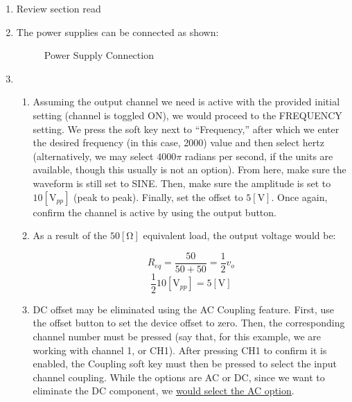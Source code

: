 \begin{enumerate}

  \item Review section read \textcolor{green}{\checkmark}

  \item The power supplies can be connected as shown:

    \begin{figure}[H]
      \centering
      
      \caption{Power Supply Connection}
      \label{fig:1}
    \end{figure}

  \item

    \begin{enumerate}

      \item Assuming the output channel we need is active with the provided initial setting (channel is toggled ON), we would proceed to the FREQUENCY setting. We press the soft key next to ``Frequency,'' after which we enter the desired frequency (in this case, 2000) value and then select hertz (alternatively, we may select $4000\pi$ radians per second, if the units are available, though this usually is not an option). From here, make sure the waveform is still set to SINE. Then, make sure the amplitude is set to $10[\si{\volt}_{pp}]$ (peak to peak). Finally, set the offset to $5[\si{\volt}]$. Once again, confirm the channel is active by using the output button.

      \item As a result of the $50[\si{\ohm}]$ equivalent load, the output voltage would be:

        $$R_{eq}=\frac{50}{50+50}=\frac{1}{2}v_{o}$$
        $$\frac{1}{2}10[\si{\volt}_{pp}]=5[\si{\volt}]$$

      \item DC offset may be eliminated using the AC Coupling feature. First, use the offset button to set the device offset to zero. Then, the corresponding channel number must be pressed (say that, for this example, we are working with channel 1, or CH1). After pressing CH1 to confirm it is enabled, the Coupling soft key must then be pressed to select the input channel coupling. While the options are AC or DC, since we want to eliminate the DC component, we \underline{would select the AC option}.

    \end{enumerate}


\end{enumerate}
